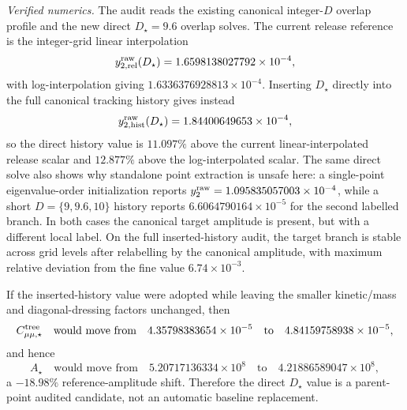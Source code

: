 \documentclass[aps,prd,onecolumn,notitlepage,nofootinbib,superscriptaddress,11pt,floatfix]{revtex4-2}
\begin{document}
\emph{Verified numerics.}
The audit  reads the existing canonical integer-\(D\) overlap profile and the new direct \(D_\star=9.6\) overlap solves.  The current release reference is the integer-grid linear interpolation
\[
y_{2,{\rm rel}}^{\rm raw}(D_\star)=1.6598138027792\times10^{-4},
\]
with log-interpolation giving \(1.6336376928813\times10^{-4}\).  Inserting \(D_\star\) directly into the full canonical tracking history gives instead
\[
y_{2,{\rm hist}}^{\rm raw}(D_\star)=1.84400649653\times10^{-4},
\]
so the direct history value is \(11.097\%\) above the current linear-interpolated release scalar and \(12.877\%\) above the log-interpolated scalar.  The same direct solve also shows why standalone point extraction is unsafe here: a single-point eigenvalue-order initialization reports \(y_2^{\rm raw}=1.095835057003\times10^{-4}\), while a short \(D=\{9,9.6,10\}\) history reports \(6.6064790164\times10^{-5}\) for the second labelled branch.  In both cases the canonical target amplitude is present, but with a different local label.  On the full inserted-history audit, the target branch is stable across grid levels after relabelling by the canonical amplitude, with maximum relative deviation from the fine value \(6.74\times10^{-3}\).

If the inserted-history value were adopted while leaving the smaller kinetic/mass and diagonal-dressing factors unchanged, then
\[
C_{\mu\mu,\star}^{\rm tree}
\quad\text{would move from}\quad
4.35798383654\times10^{-5}
\quad\text{to}\quad
4.84159758938\times10^{-5},
\]
and hence
\[
A_\star
\quad\text{would move from}\quad
5.20717136334\times10^{8}
\quad\text{to}\quad
4.21886589047\times10^{8},
\]
a \(-18.98\%\) reference-amplitude shift.  Therefore the direct \(D_\star\) value is a parent-point audited candidate, not an automatic baseline replacement.
\end{document}
